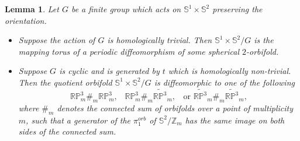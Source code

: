 \documentclass[11pt]{amsart}
\theoremstyle{plain}
\numberwithin{theorem}{section}
\newtheorem{lemma}[theorem]{Lemma}
\theoremstyle{definition}
\begin{document}
\begin{lemma}
Let $G$ be a finite group which acts on ${{\mathbb S}}^1\times {{\mathbb S}}^2$ preserving the orientation. 
\begin{itemize}
\item Suppose the action of $G$ is homologically trivial. Then ${{\mathbb S}}^1\times {{\mathbb S}}^2/G$ is the mapping
torus of a periodic diffeomorphism of some spherical $2$-orbifold.
\item Suppose $G$ is cyclic and is generated by $t$ which is homologically non-trivial. Then 
the quotient orbifold ${{\mathbb S}}^1\times {{\mathbb S}}^2/G$ is diffeomorphic to one of the following
$$
{{\mathbb R}}{{\mathbb P}}^3_m \#_{m} {{\mathbb R}}{{\mathbb P}}^3_m,\;\;\; {{\mathbb R}}{{\mathbb P}}^3_m \#_{m} \widetilde{{{\mathbb R}}{{\mathbb P}}^3}_m, \;\; \mbox{ or  }
\widetilde{{{\mathbb R}}{{\mathbb P}}^3}_m\#_{m} \widetilde{{{\mathbb R}}{{\mathbb P}}^3}_m,
$$
where $\#_m$ denotes the connected sum of orbifolds over a point of multiplicity $m$, such that a 
generator of the $\pi_1^{orb}$ of ${{\mathbb S}}^2/{{\mathbb Z}}_m$ has the same image on both sides of the connected sum.
\end{itemize}
\end{lemma}
\end{document}
